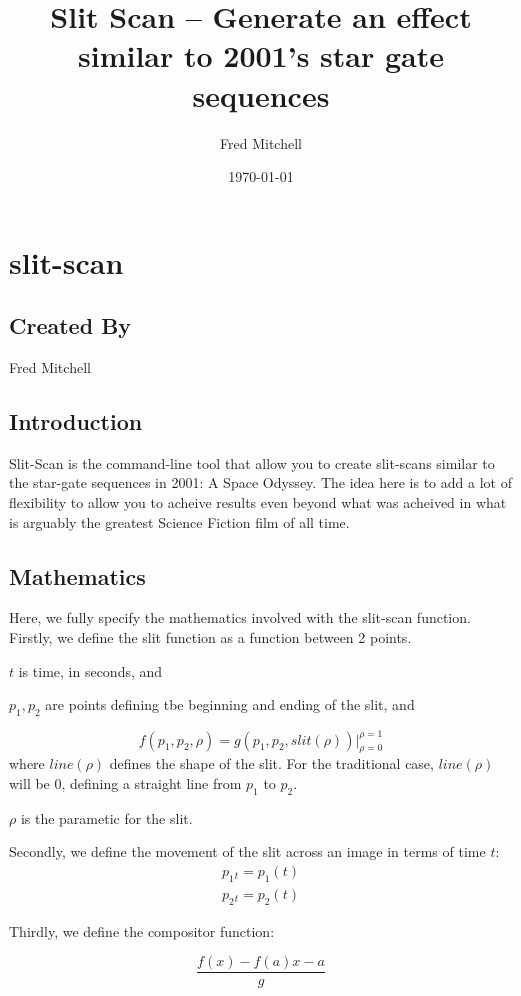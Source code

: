 \documentclass[letterpaper, 11pt]{article}
\author{Fred Mitchell}
\date{\today}
\title{Slit Scan -- Generate an effect similar to 2001's star gate sequences}
\begin{document}
\maketitle
\tableofcontents


\section{slit-scan}
\label{sec:org4fc88cb}
\subsection{Created By}
\label{sec:org4cf805a}
Fred Mitchell
\subsection{Introduction}
\label{sec:org5ed55df}
Slit-Scan is the command-line tool that allow you to create slit-scans similar to
the star-gate sequences in 2001: A Space Odyssey. The idea here is to add a lot of flexibility
to allow you to acheive results even beyond what was acheived in what is arguably the greatest
Science Fiction film of all time.
\subsection{Mathematics}
\label{sec:org6dd5691}
Here, we fully specify the mathematics involved with the slit-scan function.
Firstly, we define the slit function as a function between 2 points.

\item $t$ is time, in seconds, and
\item $p_1, p_2$
are points defining tbe beginning and ending of the slit, and
\item $$
 f(p_1, p_2, \rho) = g(p_1, p_2, slit(\rho)) \Bigr| _{\rho=0} ^{\rho=1}
$$
where \(line(\rho)\) defines the shape of the slit. For the traditional case,
\(line(\rho)\) will be \(0\), defining a straight line from \(p_1\) to \(p_2\).

\(\rho\) is the parametic for the slit.

Secondly, we define the movement of the slit across an image in terms of time \(t\):
$$
\begin{array}{l}
    p_1{_t} = p_1(t)\\
    p_2{_t} = p_2(t)
\end{array}
$$

Thirdly, we define the compositor function:


$$
 \frac{f(x)-f(a) x-a}g
$$
\end{document}

